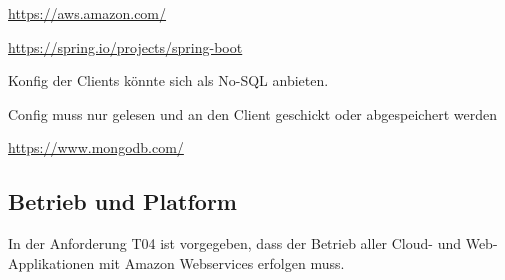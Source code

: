 \url{https://aws.amazon.com/}

    \url{https://spring.io/projects/spring-boot}

    Konfig der Clients könnte sich als No-SQL anbieten.

    Config muss nur gelesen und an den Client geschickt oder abgespeichert werden

    \url{https://www.mongodb.com/}


\subsection{Betrieb und Platform}\label{subsec:betrieb-und-platform}

In der Anforderung T04 ist vorgegeben, dass der Betrieb aller Cloud- und Web-Applikationen mit Amazon Webservices erfolgen muss.
